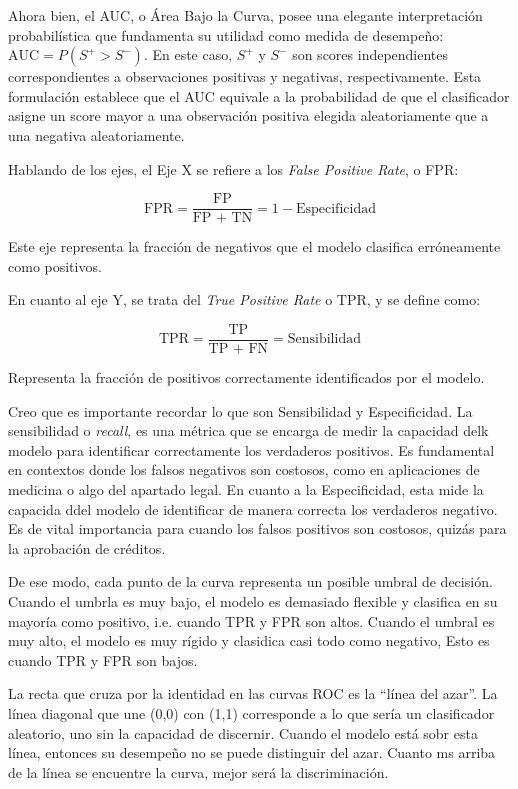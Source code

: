         Ahora bien, el AUC, o Área Bajo la Curva, posee una elegante interpretación probabilística que fundamenta
        su utilidad como medida de desempeño: $\text{AUC} = P(S^+ > S^-)$. En este caso, $S^+$ y $S^-$ son scores
        independientes correspondientes a observaciones positivas y negativas, respectivamente. Esta formulación
        establece que el AUC equivale a la probabilidad de que el clasificador asigne un score mayor a una observación
        positiva elegida aleatoriamente que a una negativa aleatoriamente. 

        Hablando de los ejes, el Eje X se refiere a los \textit{False Positive Rate}, o FPR:

        \[
            \text{FPR} = \frac{\text{FP}}{\text{FP + TN}} = 1 - \text{Especificidad}
        \]

        Este eje representa la fracción de negativos que el modelo clasifica erróneamente como positivos. 

        En cuanto al eje Y, se trata del \textit{True Positive Rate} o TPR, y se define como:

        \[
            \text{TPR} = \frac{\text{TP}}{\text{TP + FN}} = \text{Sensibilidad}
        \]

        Representa la fracción de positivos correctamente identificados por el modelo. 

        Creo que es importante recordar lo que son Sensibilidad y Especificidad. La sensibilidad o \textit{recall}, 
        es una métrica que se encarga de medir la capacidad delk modelo para identificar correctamente los verdaderos
        positivos. Es fundamental en contextos donde los falsos negativos son costosos, como en aplicaciones de medicina
        o algo del apartado legal. En cuanto a la Especificidad, esta mide la capacida ddel modelo de identificar
        de manera correcta los verdaderos negativo. Es de vital importancia para cuando los falsos positivos 
        son costosos, quizás para la aprobación de créditos. 

        De ese modo, cada punto de la curva representa un posible umbral de decisión. Cuando el umbrla es
        muy bajo, el modelo es demasiado flexible y clasifica en su mayoría como positivo, i.e. cuando TPR y FPR son altos.
        Cuando el umbral es muy alto, el modelo es muy rígido y clasidica casi todo como negativo, Esto es cuando TPR y FPR son bajos. 

        La recta que cruza por la identidad en las curvas ROC es la ``línea del azar''. La línea diagonal que
        une (0,0) con (1,1) corresponde a lo que sería un clasificador aleatorio, uno sin la capacidad de discernir. Cuando
        el modelo está sobr esta línea, entonces su desempeño no se puede distinguir del azar. Cuanto ms arriba 
        de la línea se encuentre la curva, mejor será la discriminación.

